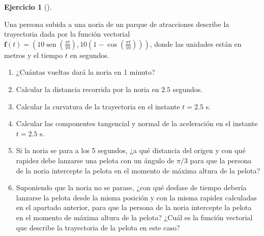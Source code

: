 \documentclass[
  spanish,
  a4paper,
]{scrreport}
\theoremstyle{definition}
\newtheorem{exercise}{Ejercicio}[chapter]
\theoremstyle{remark}
\begin{document}
\begin{exercise}[]\protect\hypertarget{exr-3}{}\label{exr-3}

Una persona subida a una noria de un parque de atracciones describe la
trayectoria dada por la función vectorial
\(\mathbf{f}(t) = (10\operatorname{sen}\left(\frac{\pi t}{10}\right),  10(1-\cos\left(\frac{\pi t}{10}\right)))\),
donde las unidades están en metros y el tiempo \(t\) en segundos.

\begin{enumerate}
\def\labelenumi{\alph{enumi}.}
\item
  ¿Cuántas vueltas dará la noria en 1 minuto?
\item
  Calcular la distancia recorrida por la noria en \(2.5\) segundos.
\item
  Calcular la curvatura de la trayectoria en el instante \(t = 2.5\) s.
\item
  Calcular las componentes tangencial y normal de la aceleración en el
  instante \(t = 2.5\) s.
\item
  Si la noria se para a los 5 segundos, ¿a qué distancia del origen y
  con qué rapidez debe lanzarse una pelota con un ángulo de \(\pi/3\)
  para que la persona de la noria intercepte la pelota en el momento de
  máxima altura de la pelota?
\item
  Suponiendo que la noria no se parase, ¿con qué desfase de tiempo
  debería lanzarse la pelota desde la misma posición y con la misma
  rapidez calculadas en el apartado anterior, para que la persona de la
  noria intercepte la pelota en el momento de máxima altura de la
  pelota? ¿Cuál es la función vectorial que describe la trayectoria de
  la pelota en este caso?
\end{enumerate}

\end{exercise}
\end{document}
